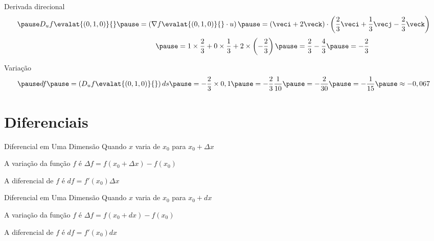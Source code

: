 \begin{resolution}{Derivada direcional}
  \[
  \pause
  D_u f\evalat{(0, 1, 0)}{}
  \pause
  = \left(\nabla f\evalat{(0, 1, 0)}{} \cdot u\right)
  \pause
  = \left(\veci + 2\veck\right)
  \cdot
  \left(\frac{2}{3} \veci + \frac{1}{3} \vecj - \frac{2}{3} \veck\right)
  \]
  \[
  \hphantom{D_u f\evalat{(0, 1, 0)}{}}
  \pause
  = 1\times\frac{2}{3} + 0\times\frac{1}{3} + 2 \times\left(- \frac{2}{3}\right)
  \pause
  = \frac{2}{3} - \frac{4}{3}
  \pause
  = -\frac{2}{3}
  \]
\end{resolution}

\begin{resolution}{Variação}
  \[
  \pause
  df
  \pause
  = \left(D_u f\evalat{(0, 1, 0)}{}\right) ds
  \pause
  = -\frac{2}{3}\times 0,1
  \pause
  = -\frac{2}{3} \frac{1}{10}
  \pause
  = -\frac{2}{30}
  \pause
  = -\frac{1}{15}
  \pause
  \approx -0,067
  \]
\end{resolution}

\section{Diferenciais}

\begin{frame}{Diferencial em Uma Dimensão}
  Quando $x$ varia de $x_0$ para
  \tabto{55mm}\(x_0+\Delta x\)

  \pause
  \vspace{\baselineskip}
  A variação da função $f$ é
  \tabto{55mm}\(\Delta f = f(x_0 + \Delta x) - f(x_0)\)

  \pause
  \vspace{\baselineskip}
  A diferencial de $f$ é
  \tabto{55mm}\(df = f'(x_0) \Delta x\)
\end{frame}

\begin{frame}{Diferencial em Uma Dimensão}
  Quando $x$ varia de $x_0$ para
  \tabto{55mm}\(x_0+dx\)

  \vspace{\baselineskip}
  A variação da função $f$ é
  \tabto{55mm}\(\Delta f = f(x_0 + dx) - f(x_0)\)

  \vspace{\baselineskip}
  A diferencial de $f$ é
  \tabto{55mm}\(df = f'(x_0) dx\)
\end{frame}

